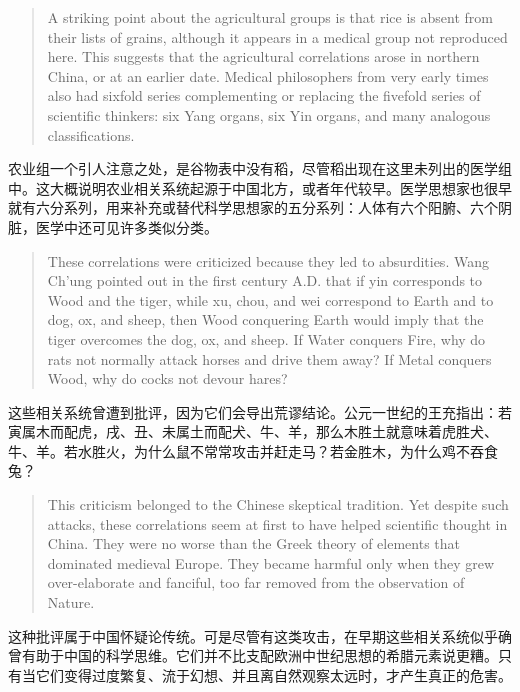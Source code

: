\documentclass[UTF8,zihao=-4]{ctexart}
\newenvironment{enblock}
  {\par\smallskip\noindent{\scriptsize\bfseries English}\par\begin{quote}\small}
  {\end{quote}}
\newenvironment{zhblock}
  {\par\noindent{\scriptsize\bfseries 中文}\par}
  {\par\medskip}
\begin{document}
\begin{enblock}
A striking point about the agricultural groups is that rice is absent from their lists of grains, although it appears in a medical group not reproduced here. This suggests that the agricultural correlations arose in northern China, or at an earlier date. Medical philosophers from very early times also had sixfold series complementing or replacing the fivefold series of scientific thinkers: six Yang organs, six Yin organs, and many analogous classifications.
\end{enblock}
\begin{zhblock}
农业组一个引人注意之处，是谷物表中没有稻，尽管稻出现在这里未列出的医学组中。这大概说明农业相关系统起源于中国北方，或者年代较早。医学思想家也很早就有六分系列，用来补充或替代科学思想家的五分系列：人体有六个阳腑、六个阴脏，医学中还可见许多类似分类。
\end{zhblock}

\begin{enblock}
These correlations were criticized because they led to absurdities. Wang Ch'ung pointed out in the first century A.D. that if yin corresponds to Wood and the tiger, while xu, chou, and wei correspond to Earth and to dog, ox, and sheep, then Wood conquering Earth would imply that the tiger overcomes the dog, ox, and sheep. If Water conquers Fire, why do rats not normally attack horses and drive them away? If Metal conquers Wood, why do cocks not devour hares?
\end{enblock}
\begin{zhblock}
这些相关系统曾遭到批评，因为它们会导出荒谬结论。公元一世纪的王充指出：若寅属木而配虎，戌、丑、未属土而配犬、牛、羊，那么木胜土就意味着虎胜犬、牛、羊。若水胜火，为什么鼠不常常攻击并赶走马？若金胜木，为什么鸡不吞食兔？
\end{zhblock}

\begin{enblock}
This criticism belonged to the Chinese skeptical tradition. Yet despite such attacks, these correlations seem at first to have helped scientific thought in China. They were no worse than the Greek theory of elements that dominated medieval Europe. They became harmful only when they grew over-elaborate and fanciful, too far removed from the observation of Nature.
\end{enblock}
\begin{zhblock}
这种批评属于中国怀疑论传统。可是尽管有这类攻击，在早期这些相关系统似乎确曾有助于中国的科学思维。它们并不比支配欧洲中世纪思想的希腊元素说更糟。只有当它们变得过度繁复、流于幻想、并且离自然观察太远时，才产生真正的危害。
\end{zhblock}
\end{document}
